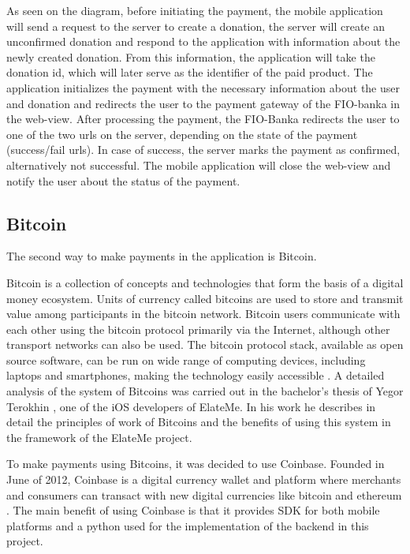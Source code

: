 
As seen on the diagram, before initiating the payment, the mobile application will send a request to the server to
create a donation, the server will create an unconfirmed donation and respond to the application with information about
the newly created donation. From this information, the application will take the donation id, which will later serve as
the identifier of the paid product. The application initializes the payment with the necessary information about the
user and donation and redirects the user to the payment gateway of the FIO-banka in the web-view. After processing the
payment, the FIO-Banka redirects the user to one of the two urls on the server, depending on the state of
the payment (success/fail urls). In case of success, the server marks the payment as confirmed, alternatively not
successful. The mobile application will close the web-view and notify the user about the status of the payment.

\subsection{Bitcoin}
The second way to make payments in the application is Bitcoin.

Bitcoin is a collection of concepts and technologies that form the basis of a digital money ecosystem. Units of currency
called bitcoins are used to store and transmit value among participants in the bitcoin network. Bitcoin users
communicate with each other using the bitcoin protocol primarily via the Internet, although other transport networks can
also be used. The bitcoin protocol stack, available as open source software, can be run on wide range of computing
devices, including laptops and smartphones, making the technology easily accessible \cite{bitcoin}. A detailed analysis
of the system of Bitcoins was carried out in the bachelor's thesis of Yegor Terokhin \cite{ios1}, one of the iOS
developers of ElateMe. In his work he describes in detail the principles of work of Bitcoins and the benefits of using
this system in the framework of the ElateMe project.

To make payments using Bitcoins, it was decided to use Coinbase. Founded in June of 2012, Coinbase is a digital currency
wallet and platform where merchants and consumers can transact with new digital currencies like bitcoin and ethereum
\cite{coinbase}. The main benefit of using Coinbase is that it provides \ac{SDK} for both mobile platforms and a python
used for the implementation of the backend in this project.

